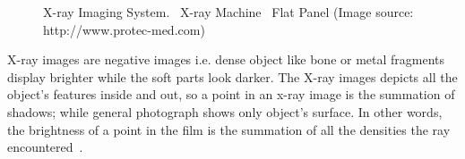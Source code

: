 \begin{figure}%
\centering
{}%
\hspace{8pt}
%
\caption[X-ray Imaging System]{X-ray Imaging System.~ X-ray Machine~ Flat Panel \tiny({Image source: http://www.protec-med.com})}
\label{fig:x-ray-system}
\end{figure}

\noindent X-ray images are negative images i.e. dense object like bone or metal fragments display brighter while the soft parts look darker. The X-ray images depicts all the object's features inside and out, so a point in an x-ray image is the summation of shadows; while general photograph shows only object's surface. In other words, the brightness of a point in the film is the summation of all the densities the ray encountered~\cite{Durnavich:00:online}.\\ 

